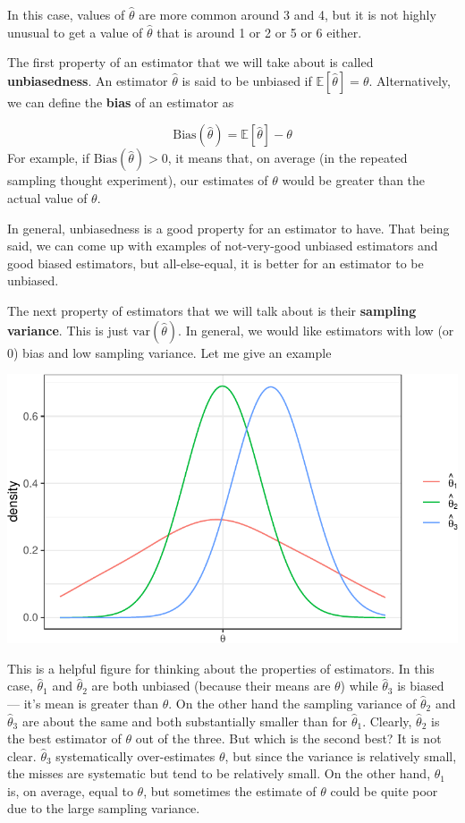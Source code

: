 \documentclass[
  letterpaper,
  DIV=11,
  numbers=noendperiod]{scrreprt}
\begin{document}
In this case, values of \(\hat{\theta}\) are more common around 3 and 4,
but it is not highly unusual to get a value of \(\hat{\theta}\) that is
around 1 or 2 or 5 or 6 either.

The first property of an estimator that we will take about is called
\textbf{unbiasedness}. An estimator \(\hat{\theta}\) is said to be
unbiased if \(\mathbb{E}[\hat{\theta}] = \theta\). Alternatively, we can
define the \textbf{bias} of an estimator as

\[
  \textrm{Bias}(\hat{\theta}) = \mathbb{E}[\hat{\theta}] - \theta
\] For example, if \(\textrm{Bias}(\hat{\theta}) > 0\), it means that,
on average (in the repeated sampling thought experiment), our estimates
of \(\theta\) would be greater than the actual value of \(\theta\).

In general, unbiasedness is a good property for an estimator to have.
That being said, we can come up with examples of not-very-good unbiased
estimators and good biased estimators, but all-else-equal, it is better
for an estimator to be unbiased.

The next property of estimators that we will talk about is their
\textbf{sampling variance}. This is just \(\mathrm{var}(\hat{\theta})\).
In general, we would like estimators with low (or 0) bias and low
sampling variance. Let me give an example

\includegraphics{03-estimators_files/figure-pdf/unnamed-chunk-2-1.pdf}

This is a helpful figure for thinking about the properties of
estimators. In this case, \(\hat{\theta}_1\) and \(\hat{\theta}_2\) are
both unbiased (because their means are \(\theta\)) while
\(\hat{\theta}_3\) is biased --- it's mean is greater than \(\theta\).
On the other hand the sampling variance of \(\hat{\theta}_2\) and
\(\hat{\theta}_3\) are about the same and both substantially smaller
than for \(\hat{\theta}_1\). Clearly, \(\hat{\theta}_2\) is the best
estimator of \(\theta\) out of the three. But which is the second best?
It is not clear. \(\hat{\theta}_3\) systematically over-estimates
\(\theta\), but since the variance is relatively small, the misses are
systematic but tend to be relatively small. On the other hand,
\(\hat{\theta}_1\) is, on average, equal to \(\theta\), but sometimes
the estimate of \(\theta\) could be quite poor due to the large sampling
variance.
\end{document}
